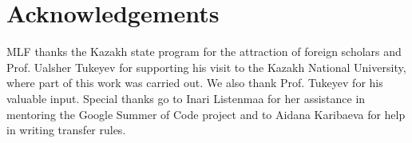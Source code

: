 \documentclass[11pt]{article}
\begin{document}
\section*{Acknowledgements}

MLF thanks the Kazakh state program for the attraction of foreign scholars and Prof. Ualsher Tukeyev for supporting his visit to the Kazakh National University, where part of this work was carried out. We also thank Prof. Tukeyev for his valuable input. Special thanks go to Inari Listenmaa for her assistance in mentoring the Google Summer of Code project and to Aidana Karibaeva for help in writing transfer rules.




\end{document}
